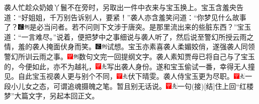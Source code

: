 袭人忙趁众奶娘丫鬟不在旁时，另取出一件中衣来与宝玉换上。宝玉含羞央告道：“好姐姐，千万别告诉别人，要紧！”袭人亦含羞笑问道：“你梦见什么故事了？{\includegraphics[width=3mm]{../Images/00006}\includegraphics[width=3mm]{../Images/00011}\footnotesize \kaishu 是必当问者。若不问则下文涉于唐突。}是那里流出来的些脏东西？”宝玉道：“一言难尽。”说着，便把梦中之事细说与袭人听了，然后说至警幻所授云雨之情，羞的袭人掩面伏身而笑。{\includegraphics[width=3mm]{../Images/00006}\includegraphics[width=3mm]{../Images/00011}\footnotesize \kaishu 试想。}宝玉亦素喜袭人柔媚姣俏，遂强袭人同领警幻所训云雨之事。{\includegraphics[width=3mm]{../Images/00002}\includegraphics[width=3mm]{../Images/00011}\footnotesize \kaishu 数句文完一回提纲文字。}袭人素知贾母已将自己与了宝玉的，今便如此，亦不为越礼，{\includegraphics[width=3mm]{../Images/00002}\includegraphics[width=3mm]{../Images/00012}\footnotesize \kaishu 写出袭人身份。}遂和宝玉偷试一番，幸得无人撞见。自此宝玉视袭人更与别个不同，{\includegraphics[width=3mm]{../Images/00002}\includegraphics[width=3mm]{../Images/00012}\footnotesize \kaishu 伏下晴雯。}袭人侍宝玉更为尽职。{\includegraphics[width=3mm]{../Images/00002}\includegraphics[width=3mm]{../Images/00012}\footnotesize \kaishu 一段小儿女之态，可谓追魂摄魄之笔。}暂且别无话说。{{\includegraphics[width=3mm]{../Images/00002}\includegraphics[width=3mm]{../Images/00012}\footnotesize \kaishu 一句{(接)}{[}结{]}住上回“红楼梦”大篇文字，另起本回正文。}}

